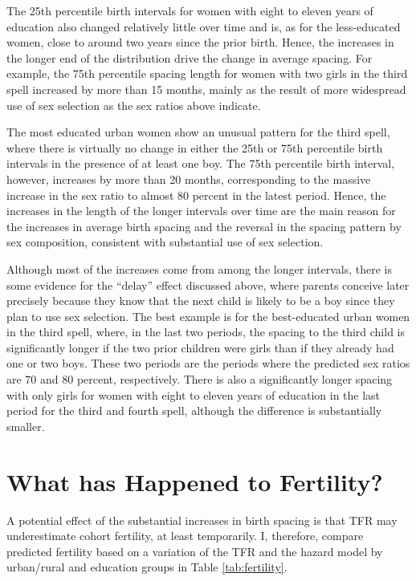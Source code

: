 \documentclass[12pt,letterpaper]{article}
\begin{document}
The 25th percentile birth intervals for women with eight to eleven years of education also 
changed relatively little over time and is, as for the less-educated women, close to
around two years since the prior birth.
Hence, the increases in the longer end of the distribution drive
the change in average spacing.
For example, the 75th percentile spacing length for women with two girls in the third 
spell increased by more than 15 months, mainly as the result of more widespread use of sex 
selection as the sex ratios above indicate.
 
The most educated urban women show an unusual pattern for the third spell, where there 
is virtually no change in either the 25th or 75th percentile birth intervals in the
presence of at least one boy.
The 75th percentile birth interval, however, increases by more than 20 months,
corresponding to the massive increase in the sex ratio to almost 80 percent in the 
latest period.
Hence, the increases in the length of the longer intervals over time are
the main reason for the increases in average birth spacing and the
reversal in the spacing pattern by sex composition, consistent with
substantial use of sex selection.

Although most of the increases come from among the longer intervals, there is some 
evidence for the ``delay'' effect discussed above, where parents conceive later
precisely because they know that the next child is likely to be a boy since they plan
to use sex selection.
The best example is for the best-educated urban women in the third spell, where, in the 
last two periods, the spacing to the third child is significantly longer if the two prior 
children were girls than if they already had one or two boys.
These two periods are the periods where the predicted sex ratios are 70 and 80 percent,
respectively.
There is also a significantly longer spacing with only girls for women with eight to
eleven years of education in the last period for the third and fourth spell, although
the difference is substantially smaller.


\section{What has Happened to Fertility?\label{sec:fertility}}

A potential effect of the substantial increases in birth spacing is that TFR may 
underestimate cohort fertility, at least temporarily.
I, therefore, compare predicted fertility based on a variation of the TFR and the 
hazard model by urban/rural and education groups in Table \ref{tab:fertility}.
\end{document}
